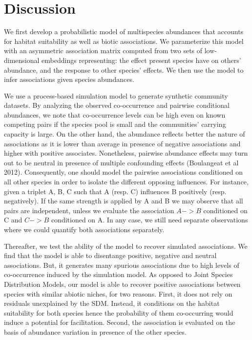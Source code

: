 \documentclass[10pt,a4paper]{article}
\begin{document}
\section{Discussion}
We first develop a probabilistic model of multispecies abundances that accounts for habitat suitability as well as biotic associations. We parameterize this model with an asymmetric association matrix computed from two sets of low-dimensional embeddings representing: the effect present species have on others' abundance, and the response to other species' effects. We then use the model to infer associations given species abundances. 

We use a process-based simulation model to generate synthetic community datasets. By analyzing the observed co-occurrence and pairwise conditional abundances, we note that co-occurrence levels can be high even on known competing pairs if the species pool is small and the communities' carrying capacity is large. On the other hand, the abundance reflects better the nature of associations as it is lower than average in presence of negative associations and higher with positive associates. Nonetheless, pairwise abundance effects may turn out to be neutral in presence of multiple confounding effects (Boulangeat et al 2012). Consequently, one should model the pairwise associations conditioned on all other species in order to isolate the different opposing influences. For instance, given a triplet A, B, C such that A (resp. C) influences B positively (resp. negatively). If the same strength is applied by A and B we may observe that all pairs are independent, unless we evaluate the association $ A -> B $ conditioned on C and $C -> B$ conditioned on A. In any case, we still need separate observations where we could quantify both associations separately. 

Thereafter, we test the ability of the model to recover simulated associations. We find that the model is able to disentange positive, negative and neutral associations. But, it generates many spurious associations due to high levels of co-occurrence induced by the simulation model. As opposed to Joint Species Distribution Models, our model is able to recover positive associations between species with similar abiotic niches, for two reasons. First, it does not rely on residuals unexplained by the SDM. Instead, it conditions on the habitat suitability for both species hence the probability of them co-occurring would induce a potential for facilitation. Second, the association is evaluated on the basis of abundance variation in presence of the other species. \\ 
\end{document}
